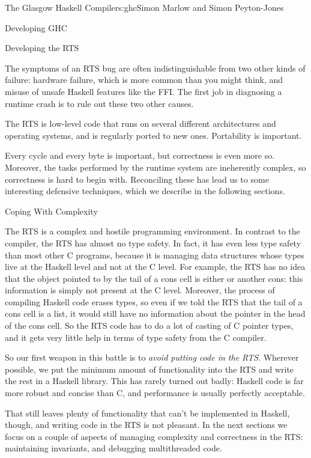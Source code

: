 \begin{aosachapter}{The Glasgow Haskell Compiler}{s:ghc}{Simon Marlow and Simon Peyton-Jones}
\begin{aosasect1}{Developing GHC}
\begin{aosasect2}{Developing the RTS}
\begin{aosaenumerate}
  The symptoms of an RTS bug are often indistinguishable from two
  other kinds of failure: hardware failure, which is more common than
  you might think, and misuse of unsafe Haskell features like the FFI.
  The first job in diagnosing a runtime crash is to rule out these two
  other causes.

\item The RTS is low-level code that runs on several different
  architectures and operating systems, and is regularly ported to new
  ones.  Portability is important.

\end{aosaenumerate}

Every cycle and every byte is important, but correctness is even more
so.  Moreover, the tasks performed by the runtime system are
ineherently complex, so correctness is hard to begin with.
Reconciling these has lead us to some interesting defensive
techniques, which we describe in the following sections.

\begin{aosasect3}{Coping With Complexity}
\label{s:rtsbugs}

The RTS is a complex and hostile programming environment.  In contrast
to the compiler, the RTS has almost no type safety.  In fact, it has
even less type safety than most other C programs, because it is
managing data structures whose types live at the Haskell level and not
at the C level.  For example, the RTS has no idea that the object
pointed to by the tail of a cons cell is either \code{[]} or another
cons: this information is simply not present at the C level.
Moreover, the process of compiling Haskell code erases types, so even
if we told the RTS that the tail of a cons cell is a list, it would
still have no information about the pointer in the head of the cons
cell.  So the RTS code has to do a lot of casting of C pointer types,
and it gets very little help in terms of type safety from the C
compiler.

So our first weapon in this battle is to \emph{avoid putting code in
  the RTS}.  Wherever possible, we put the minimum amount of
functionality into the RTS and write the rest in a Haskell library.
This has rarely turned out badly: Haskell code is far more robust and
concise than C, and performance is usually perfectly acceptable.

That still leaves plenty of functionality that can't be implemented in
Haskell, though, and writing code in the RTS is not pleasant.  In the
next sections we focus on a couple of aspects of managing complexity
and correctness in the RTS: maintaining invariants, and debugging
multithreaded code.


\end{aosasect3}
\end{aosasect2}
\end{aosasect1}
\end{aosachapter}
